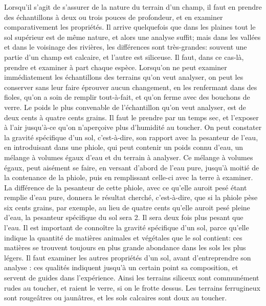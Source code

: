 Lorsqu'il s'agit de s'assurer de la nature du terrain d'un champ, il faut en prendre des échantillons à deux ou trois pouces de profondeur, et en examiner comparativement les propriétés. Il arrive quelquefois que dans les plaines tout le sol supérieur est de même nature, et alors une analyse suffit; mais dans les vallées et dans le voisinage des rivières, les différences sont très-grandes: souvent une partie d'un champ est calcaire, et l'autre est siliceuse. Il faut, dans ce cas-là, prendre et examiner à part chaque espèce.
Lorsqu'on ne peut examiner immédiatement les échantillons des terrains qu'on veut analyser, on peut les conserver sans leur faire éprouver aucun changement, en les renfermant dans des fioles, qu'on a soin de remplir tout-à-fait, et qu'on ferme avec des bouchons de verre.\setcounter{page}{422} Le poids le plus convenable de l'échantillon qu'on veut analyser, est de deux cents à quatre cents grains. Il faut le prendre par un temps sec, et l'exposer à l'air jusqu'à-ce qu'on n'aperçoive plus d'humidité au toucher.
On peut constater la gravité spécifique d'un sol, c'est-à-dire, son rapport avec la pesanteur de l'eau, en introduisant dans une phiole, qui peut contenir un poids connu d'eau, un mélange à volumes égaux d'eau et du terrain à analyser. Ce mélange à volumes égaux, peut aisément se faire, en versant d'abord de l'eau pure, jusqu'à moitié de la contenance de la phiole, puis en remplissant celle-ci avec la terre à examiner. La différence de la pesanteur de cette phiole, avec ce qu'elle auroit pesé étant remplie d'eau pure, donnera le résultat cherché, c'est-à-dire, que si la phiole pèse six cents grains, par exemple, au lieu de quatre cents qu'elle auroit pesé pleine d'eau, la pesanteur spécifique du sol sera 2. Il sera deux fois plus pesant que l'eau.
Il est important de connoître la gravité spécifique d'un sol, parce qu'elle indique la quantité de matières animales et végétales que le sol contient: ces matières se trouvent toujours en plus grande abondance dans les sols les plus légers.\setcounter{page}{423} Il faut examiner les autres propriétés d'un sol, avant d'entreprendre son analyse : ces qualités indiquent jusqu'à un certain point sa composition, et servent de guides dans l'expérience. Ainsi les terrains siliceux sont communément rudes au toucher, et raient le verre, si on le frotte dessus. Les terrains ferrugineux sont rougeâtres ou jaunâtres, et les sols calcaires sont doux au toucher.
